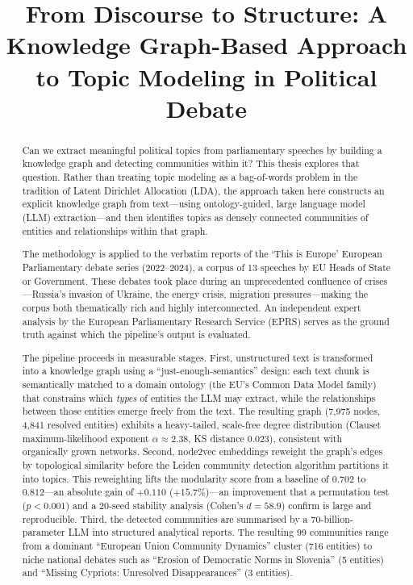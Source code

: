 \documentclass[11pt]{article}
\title{From Discourse to Structure: A Knowledge Graph-Based Approach to Topic Modeling in Political Debate}
\author{}
\date{}
\begin{document}
\maketitle

\begin{abstract}
Can we extract meaningful political topics from parliamentary speeches by building a knowledge graph and detecting communities within it? This thesis explores that question. Rather than treating topic modeling as a bag-of-words problem in the tradition of Latent Dirichlet Allocation (LDA), the approach taken here constructs an explicit knowledge graph from text---using ontology-guided, large language model (LLM) extraction---and then identifies topics as densely connected communities of entities and relationships within that graph.

The methodology is applied to the verbatim reports of the `This is Europe' European Parliamentary debate series (2022--2024), a corpus of 13 speeches by EU Heads of State or Government. These debates took place during an unprecedented confluence of crises---Russia's invasion of Ukraine, the energy crisis, migration pressures---making the corpus both thematically rich and highly interconnected. An independent expert analysis by the European Parliamentary Research Service (EPRS) serves as the ground truth against which the pipeline's output is evaluated.

The pipeline proceeds in measurable stages. First, unstructured text is transformed into a knowledge graph using a ``just-enough-semantics'' design: each text chunk is semantically matched to a domain ontology (the EU's Common Data Model family) that constrains which \emph{types} of entities the LLM may extract, while the relationships between those entities emerge freely from the text. The resulting graph (7{,}975 nodes, 4{,}841 resolved entities) exhibits a heavy-tailed, scale-free degree distribution (Clauset maximum-likelihood exponent $\alpha \approx 2.38$, KS distance $0.023$), consistent with organically grown networks. Second, node2vec embeddings reweight the graph's edges by topological similarity before the Leiden community detection algorithm partitions it into topics. This reweighting lifts the modularity score from a baseline of $0.702$ to $0.812$---an absolute gain of $+0.110$ ($+15.7\%$)---an improvement that a permutation test ($p<0.001$) and a 20-seed stability analysis (Cohen's $d = 58.9$) confirm is large and reproducible. Third, the detected communities are summarised by a 70-billion-parameter LLM into structured analytical reports. The resulting 99 communities range from a dominant ``European Union Community Dynamics'' cluster (716 entities) to niche national debates such as ``Erosion of Democratic Norms in Slovenia'' (5 entities) and ``Missing Cypriots: Unresolved Disappearances'' (3 entities).


\end{abstract}
\end{document}
